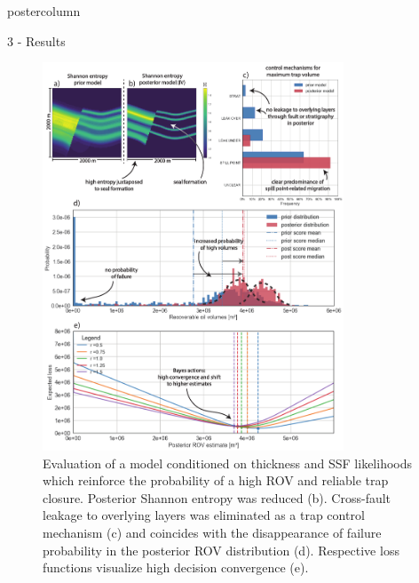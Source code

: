 \documentclass{beamer}
\begin{document}
\begin{frame}
\begin{columns}
\begin{column}{.499\textwidth}
\begin{beamercolorbox}[center]{postercolumn}
\begin{minipage}{.98\textwidth}
{\begin{myblock}{3 - Results}
	\vspace{0.2em}
	\begin{figure}
		\begin{minipage}{0.98\textwidth}
			\begin{minipage}[t]{0.49\textwidth}
				\centering\includegraphics[width=0.8\textwidth]{figures/ML4}
				\caption{Evaluation of a model conditioned on thickness and SSF likelihoods which reinforce the probability of a high ROV and reliable trap closure. Posterior Shannon entropy was reduced (b). Cross-fault leakage to overlying layers was eliminated as a trap control mechanism (c) and coincides with the disappearance of failure probability in the posterior ROV distribution (d). Respective loss functions visualize high decision convergence (e).}
				\label{fig:ML4}
			\end{minipage}

\end{minipage}
\end{figure}
\end{myblock}}
\end{minipage}
\end{beamercolorbox}
\end{column}
\end{columns}
\end{frame}
\end{document}

